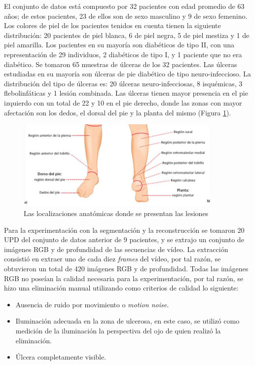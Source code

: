 El conjunto de datos está compuesto por 32 pacientes con edad promedio de 63 años; de estos pacientes, 23 de ellos son de sexo masculino y 9 de sexo femenino. Los colores de piel de los pacientes tenidos en cuenta tienen la siguiente distribución: 20 pacientes de piel blanca, 6 de piel negra, 5 de piel mestiza y 1 de piel amarilla. Los pacientes en su mayoría son diabéticos de tipo II, con una representación de 29 individuos, 2 diabéticos de tipo I, y 1 paciente que no era diabético. Se tomaron 65 muestras de úlceras de los 32 pacientes. Las úlceras estudiadas en su mayoría son úlceras de pie diabético de tipo neuro-infeccioso. La distribución del tipo de úlceras es: 20 úlceras neuro-infecciosas, 8 isquémicas, 3 flebolinfáticas y 1 lesión combinada. Las úlceras tienen mayor presencia en el pie izquierdo con un total de 22 y 10 en el pie derecho, donde las zonas con mayor afectación son los dedos, el dorsal del pie y la planta del mismo (Figura \ref{fig:loc}).

\begin{figure}[ht]
	\centering
	\includegraphics[width=10cm]{./Graphics/human.png}
	\caption{Las localizaciones anatómicas donde se presentan las lesiones}
	\label{fig:loc}
\end{figure}

Para la experimentación con la segmentación y la reconstrucción se tomaron 20 UPD del conjunto de datos anterior de 9 pacientes, y se extrajo un conjunto de imágenes RGB y de profundidad de las secuencias de vídeo. La extracción consistió en extraer uno de cada diez \textit{frames} del vídeo, por tal razón, se obtuvieron un total de 420 imágenes RGB y de profundidad. Todas las imágenes RGB no poseían la calidad necesaria para la experimentación, por tal razón, se hizo una eliminación manual utilizando como criterios de calidad lo siguiente:

\begin{itemize}
	\item Ausencia de ruido por movimiento o \textit{motion noise}.
	\item Iluminación adecuada en la zona de ulcerosa, en este caso, se utilizó como medición de la iluminación la perspectiva del ojo de quien realizó la eliminación. 
	\item Úlcera completamente visible. 
\end{itemize}

